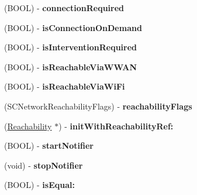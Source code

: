\begin{DoxyCompactItemize}
\item 
\hypertarget{interface_reachability_a731496d70dd8bfbd1b364df13cac2b4c}{
(\-B\-O\-O\-L) -\/ {\bfseries connection\-Required}}
\label{interface_reachability_a731496d70dd8bfbd1b364df13cac2b4c}

\item 
\hypertarget{interface_reachability_af5bea7c2cfd6439a4ff5f0ab0b92e37b}{
(\-B\-O\-O\-L) -\/ {\bfseries is\-Connection\-On\-Demand}}
\label{interface_reachability_af5bea7c2cfd6439a4ff5f0ab0b92e37b}

\item 
\hypertarget{interface_reachability_ad44af2ebf5ffd986dacad06e63362550}{
(\-B\-O\-O\-L) -\/ {\bfseries is\-Intervention\-Required}}
\label{interface_reachability_ad44af2ebf5ffd986dacad06e63362550}

\item 
\hypertarget{interface_reachability_a20011128b407d36659bc78a64cd583f5}{
(\-B\-O\-O\-L) -\/ {\bfseries is\-Reachable\-Via\-W\-W\-A\-N}}
\label{interface_reachability_a20011128b407d36659bc78a64cd583f5}

\item 
\hypertarget{interface_reachability_a994f39db8e47480480ffd7ee81159ecb}{
(\-B\-O\-O\-L) -\/ {\bfseries is\-Reachable\-Via\-Wi\-Fi}}
\label{interface_reachability_a994f39db8e47480480ffd7ee81159ecb}

\item 
\hypertarget{interface_reachability_ac9080e40006cd8c82431a668ec8bfe18}{
(\-S\-C\-Network\-Reachability\-Flags) -\/ {\bfseries reachability\-Flags}}
\label{interface_reachability_ac9080e40006cd8c82431a668ec8bfe18}

\item 
\hypertarget{interface_reachability_af8dbb23cc7f9ac59b0269dfaf83979fc}{
(\hyperlink{interface_reachability}{\-Reachability} $\ast$) -\/ {\bfseries init\-With\-Reachability\-Ref\-:}}
\label{interface_reachability_af8dbb23cc7f9ac59b0269dfaf83979fc}

\item 
\hypertarget{interface_reachability_ae20732960a222681fcc7caeb191158bc}{
(\-B\-O\-O\-L) -\/ {\bfseries start\-Notifier}}
\label{interface_reachability_ae20732960a222681fcc7caeb191158bc}

\item 
\hypertarget{interface_reachability_ab7907e9c8de0e4e15774e82c089e0b39}{
(void) -\/ {\bfseries stop\-Notifier}}
\label{interface_reachability_ab7907e9c8de0e4e15774e82c089e0b39}

\item 
\hypertarget{interface_reachability_a7158fbf023168ca543a1340d6b3ce7fb}{
(\-B\-O\-O\-L) -\/ {\bfseries is\-Equal\-:}}
\label{interface_reachability_a7158fbf023168ca543a1340d6b3ce7fb}


\end{DoxyCompactItemize}
